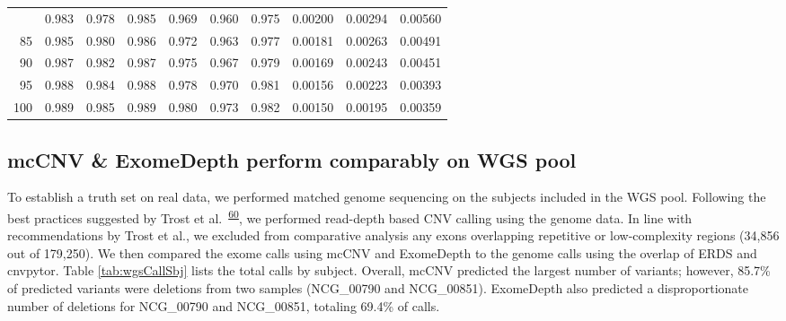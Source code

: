 \documentclass[11pt,letterpaper]{book}
\begin{document}
\begin{table}
\begin{tabular}[t]{rrrrrrrrrr}
\addlinespace
80 & 0.983 & 0.978 & 0.985 & 0.969 & 0.960 & 0.975 & 0.00200 & 0.00294 & 0.00560\\
85 & 0.985 & 0.980 & 0.986 & 0.972 & 0.963 & 0.977 & 0.00181 & 0.00263 & 0.00491\\
90 & 0.987 & 0.982 & 0.987 & 0.975 & 0.967 & 0.979 & 0.00169 & 0.00243 & 0.00451\\
95 & 0.988 & 0.984 & 0.988 & 0.978 & 0.970 & 0.981 & 0.00156 & 0.00223 & 0.00393\\
100 & 0.989 & 0.985 & 0.989 & 0.980 & 0.973 & 0.982 & 0.00150 & 0.00195 & 0.00359\\
\bottomrule
\end{tabular}
\end{table}

\hypertarget{mccnv-exomedepth-perform-comparably-on-wgs-pool}{%
\subsection{mcCNV \& ExomeDepth perform comparably on WGS pool}\label{mccnv-exomedepth-perform-comparably-on-wgs-pool}}

To establish a truth set on real data, we performed matched genome sequencing on the subjects included in the WGS pool.
Following the best practices suggested by Trost et al.~\textsuperscript{\protect\hyperlink{ref-trost:2018aa}{60}}, we performed read-depth based CNV calling using the genome data.
In line with recommendations by Trost et al., we excluded from comparative analysis any exons overlapping repetitive or low-complexity regions (34,856 out of 179,250).
We then compared the exome calls using mcCNV and ExomeDepth to the genome calls using the overlap of ERDS and cnvpytor.
Table \ref{tab:wgsCallSbj} lists the total calls by subject.
Overall, mcCNV predicted the largest number of variants; however, 85.7\% of predicted variants were deletions from two samples (NCG\_00790 and NCG\_00851).
ExomeDepth also predicted a disproportionate number of deletions for NCG\_00790 and NCG\_00851, totaling 69.4\% of calls.
\end{document}
